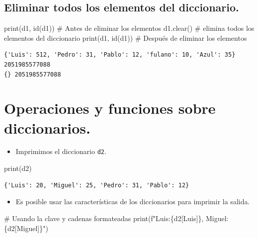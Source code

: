 \documentclass[
  spanish,
  letterpaper,
]{scrbook}
\newenvironment{Shaded}{\begin{snugshade}}{\end{snugshade}}
\newcommand{\BuiltInTok}[1]{\textcolor[rgb]{0.00,0.23,0.31}{#1}}
\newcommand{\CommentTok}[1]{\textcolor[rgb]{0.37,0.37,0.37}{#1}}
\newcommand{\NormalTok}[1]{\textcolor[rgb]{0.00,0.23,0.31}{#1}}
\newcommand{\SpecialCharTok}[1]{\textcolor[rgb]{0.37,0.37,0.37}{#1}}
\newcommand{\SpecialStringTok}[1]{\textcolor[rgb]{0.13,0.47,0.30}{#1}}
\newcommand{\StringTok}[1]{\textcolor[rgb]{0.13,0.47,0.30}{#1}}
\providecommand{\tightlist}{%
  \setlength{\itemsep}{0pt}\setlength{\parskip}{0pt}}
\theoremstyle{definition}
\theoremstyle{remark}
\begin{document}
\subsection{Eliminar todos los elementos del
diccionario.}\label{eliminar-todos-los-elementos-del-diccionario.}

\begin{Shaded}
\begin{Highlighting}[]
\BuiltInTok{print}\NormalTok{(d1, }\BuiltInTok{id}\NormalTok{(d1)) }\CommentTok{\# Antes de eliminar los elementos}
\NormalTok{d1.clear() }\CommentTok{\# elimina todos los elementos del diccionario}
\BuiltInTok{print}\NormalTok{(d1, }\BuiltInTok{id}\NormalTok{(d1)) }\CommentTok{\# Después de eliminar los elementos}
\end{Highlighting}
\end{Shaded}

\begin{verbatim}
{'Luis': 512, 'Pedro': 31, 'Pablo': 12, 'fulano': 10, 'Azul': 35} 2051985577088
{} 2051985577088
\end{verbatim}

\section{Operaciones y funciones sobre
diccionarios.}\label{operaciones-y-funciones-sobre-diccionarios.}

\begin{itemize}
\tightlist
\item
  Imprimimos el diccionario \texttt{d2}.
\end{itemize}

\begin{Shaded}
\begin{Highlighting}[]
\BuiltInTok{print}\NormalTok{(d2)}
\end{Highlighting}
\end{Shaded}

\begin{verbatim}
{'Luis': 20, 'Miguel': 25, 'Pedro': 31, 'Pablo': 12}
\end{verbatim}

\begin{itemize}
\tightlist
\item
  Es posible usar las características de los diccionarios para imprimir
  la salida.
\end{itemize}

\begin{Shaded}
\begin{Highlighting}[]
\CommentTok{\# Usando la clave y cadenas formateadas}
\BuiltInTok{print}\NormalTok{(}\SpecialStringTok{f"Luis:}\SpecialCharTok{\{}\NormalTok{d2[}\StringTok{\textquotesingle{}Luis\textquotesingle{}}\NormalTok{]}\SpecialCharTok{\}}\SpecialStringTok{, Miguel:}\SpecialCharTok{\{}\NormalTok{d2[}\StringTok{\textquotesingle{}Miguel\textquotesingle{}}\NormalTok{]}\SpecialCharTok{\}}\SpecialStringTok{"}\NormalTok{)}
\end{Highlighting}
\end{Shaded}
\end{document}

